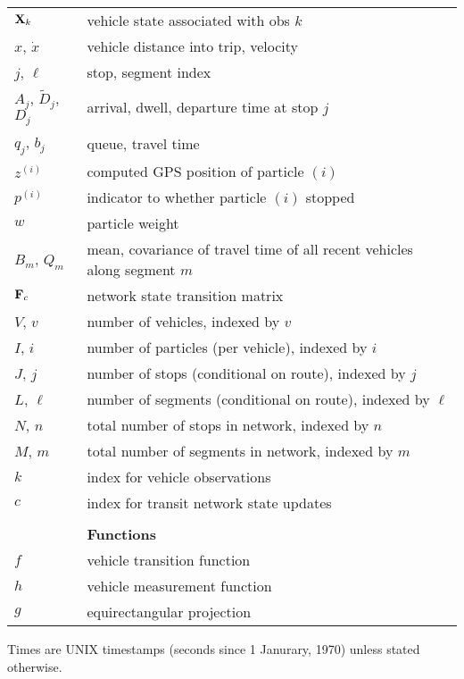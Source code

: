\documentclass[draftcls,a4paper,onecolumn]{IEEEtran}\usepackage[]{graphicx}\usepackage[]{color}
\begin{document}
\begin{xtabular}{ll}
  $\mathbf{X}_k$ & vehicle state associated with obs $k$ \\
  $x$, $\dot x$ & vehicle distance into trip, velocity \\
  $j$, $\ell$ & stop, segment index \\
  $A_j$, $\tilde D_j$, $D_j$ & arrival, dwell, departure time at stop $j$ \\
  $q_j$, $b_j$ & queue, travel time \\
  $z^{(i)}$ & computed GPS position of particle $(i)$ \\
  $p^{(i)}$ & indicator to whether particle $(i)$ stopped \\
  $w$ & particle weight \\
  $B_m$, $Q_m$ & mean, covariance of travel time of all recent vehicles along segment $m$ \\
  $\mathbf{F}_c$ & network state transition matrix \\
  $V$, $v$ & number of vehicles, indexed by $v$ \\
  $I$, $i$ & number of particles (per vehicle), indexed by $i$ \\
  $J$, $j$ & number of stops (conditional on route), indexed by $j$ \\
  $L$, $\ell$ & number of segments (conditional on route), indexed by $\ell$ \\
  $N$, $n$ & total number of stops in network, indexed by $n$ \\
  $M$, $m$ & total number of segments in network, indexed by $m$ \\
  $k$ & index for vehicle observations \\
  $c$ & index for transit network state updates \\
  \bottomrule
  \\ \toprule
  &\textbf{Functions} \\ \midrule
  $f$ & vehicle transition function \\
  $h$ & vehicle measurement function \\
  $g$ & equirectangular projection \\
  \bottomrule
\end{xtabular}
  


\vspace{1em}
Times are UNIX timestamps (seconds since 1 Janurary, 1970) unless stated otherwise.
\end{document}
